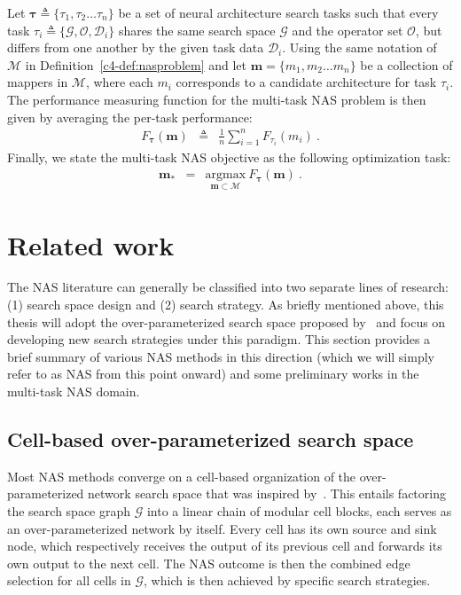 \begin{definition} 
Let $\boldsymbol{\tau} \triangleq \{\tau_1, \tau_2 \dots \tau_n\}$ be a set of neural architecture search tasks such that every task $\tau_i \triangleq \{\mathcal{G},\mathcal{O},\mathcal{D}_i\}$ shares the same search space $\mathcal{G}$ and the operator set $\mathcal{O}$, but differs from one another by the given task data $\mathcal{D}_i$.
Using the same notation of $\mathcal{M}$ in Definition~\ref{c4-def:nasproblem} and let $\mathbf{m} = \{m_1, m_2 \dots m_n\}$ be a collection of mappers in $\mathcal{M}$, where each $m_i$ corresponds to a candidate architecture for task $\tau_i$. The performance measuring function for the multi-task NAS problem is then given by averaging the per-task performance:
\begin{eqnarray}
F_{\boldsymbol{\tau}}(\mathbf{m}) &\triangleq& \frac{1}{n}\sum_{i=1}^n  F_{\tau_i}(m_i) \ .
\end{eqnarray}
Finally, we state the multi-task NAS objective as the following optimization task:
\begin{eqnarray}
\mathbf{m}_\ast &=& \underset{\mathbf{m} \subset \mathcal{M}}{\mathrm{argmax}} \  F_{\boldsymbol{\tau}}(\mathbf{m}) \ .
\end{eqnarray}
\label{c4-def:horizontalnas}
\end{definition}

\section{Related work}
The NAS literature can generally be classified into two separate lines of research: (1) search space design and (2) search strategy. As briefly mentioned above, this thesis will adopt the over-parameterized search space proposed by~\citet{bender2018understanding} and focus on developing new search strategies under this paradigm. This section provides a brief summary of various NAS methods in this direction (which we will simply refer to as NAS from this point onward) and some preliminary works in the multi-task NAS domain.
\subsection{Cell-based over-parameterized search space}
Most NAS methods converge on a cell-based organization of the over-parameterized network search space that was inspired by~\citet{pham2018}. This entails factoring the search space graph $\mathcal{G}$ into a linear chain of modular cell blocks, each serves as an over-parameterized network by itself. Every cell has its own source and sink node, which respectively receives the output of its previous cell and forwards its own output to the next cell. The NAS outcome is then the combined edge selection for all cells in $\mathcal{G}$, which is then achieved by specific search strategies.

